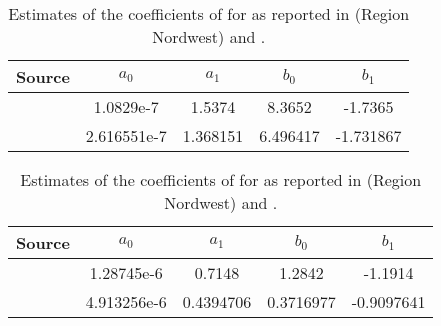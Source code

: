\newpage{}  %
\begin{singlespace}
    {\tabulinesep=2mm
    \begin{longtabu}{L S[table-format = 1.6e-1] S[table-format = 1.6] S[table-format = 1.6] S[table-format = -1.6]}  %
      \caption{Estimates of the coefficients of  for \Beech{} as reported in \textcite{Doebbeler2004} (Region Nordwest) and \textcite{Woerdehoff2016}.
        \label{tab:SterbaCoefficientsEstimatesDöbbeler}} \\
      \toprule
      Source & {\(a_0\)} & {\(a_1\)} & {\(b_0\)} & {\(b_1\)} \\
      \midrule
      \endhead
      \bottomrule
      \endlastfoot
      \textcite{Doebbeler2004} & 1.0829e-7 & 1.5374 & 8.3652 & -1.7365 \\
      \textcite{Woerdehoff2016} & 2.616551e-7 & 1.368151 & 6.496417 & -1.731867 \\
      \end{longtabu}
    }
\end{singlespace}

\begin{singlespace}
    {\tabulinesep=2mm
    \begin{longtabu}{L S[table-format = 1.6e-1] S[table-format = 1.6] S[table-format = 1.6] S[table-format = -1.6]}  %
      \caption{Estimates of the coefficients of  for \Spruce{} as reported in \textcite{Doebbeler2004} (Region Nordwest) and \textcite{Woerdehoff2016}.
        \label{tab:SterbaCoefficientsEstimatesWördehoff}} \\
      \toprule
      Source & {\(a_0\)} & {\(a_1\)} & {\(b_0\)} & {\(b_1\)} \\
      \midrule
      \endhead
      \bottomrule
      \endlastfoot
      \textcite{Doebbeler2004} & 1.28745e-6 & 0.7148 & 1.2842 & -1.1914 \\
      \textcite{Woerdehoff2016} & 4.913256e-6 & 0.4394706 & 0.3716977 & -0.9097641 \\
      \end{longtabu}
    }
\end{singlespace}

